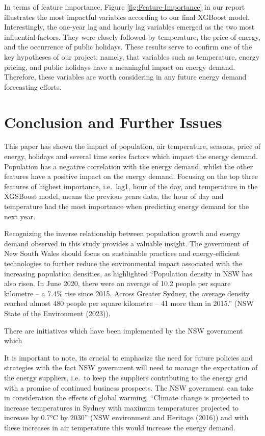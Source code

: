 \documentclass[mstat,12pt]{unswthesis}
\begin{document}
In terms of feature importance, Figure \ref{fig:Feature-Importance} in
our report illustrates the most impactful variables according to our
final XGBoost model. Interestingly, the one-year lag and hourly lag
variables emerged as the two most influential factors. They were closely
followed by temperature, the price of energy, and the occurrence of
public holidays. These results serve to confirm one of the key
hypotheses of our project: namely, that variables such as temperature,
energy pricing, and public holidays have a meaningful impact on energy
demand. Therefore, these variables are worth considering in any future
energy demand forecasting efforts.

\hypertarget{s-conclusion}{%
\chapter{Conclusion and Further Issues}\label{s-conclusion}}

This paper has shown the impact of population, air temperature, seasons,
price of energy, holidays and several time series factors which impact
the energy demand. Population has a negative correlation with the energy
demand, whilst the other features have a positive impact on the energy
demand. Focusing on the top three features of highest importance,
i.e.~lag1, hour of the day, and temperature in the XGSBoost model, means
the previous years data, the hour of day and temperature had the most
importance when predicting energy demand for the next year.

Recognizing the inverse relationship between population growth and
energy demand observed in this study provides a valuable insight. The
government of New South Wales should focus on sustainable practices and
energy-efficient technologies to further reduce the environmental impact
associated with the increasing population densities, as highlighted
``Population density in NSW has also risen. In June 2020, there were an
average of 10.2 people per square kilometre -- a 7.4\% rise since 2015.
Across Greater Sydney, the average density reached almost 480 people per
square kilometre -- 41 more than in 2015.'' (NSW State of the
Environment (2023)).

There are initiatives which have been implemented by the NSW government
which

It is important to note, its crucial to emphasize the need for future
policies and strategies with the fact NSW government will need to manage
the expectation of the energy suppliers, i.e.~to keep the suppliers
contributing to the energy grid with a promise of continued business
prospects. The NSW government can take in consideration the effects of
global warming, ``Climate change is projected to increase temperatures
in Sydney with maximum temperatures projected to increase by 0.7°C by
2030'' (NSW environment and Heritage (2016)) and with these increases in
air temperature this would increase the energy demand.
\end{document}

